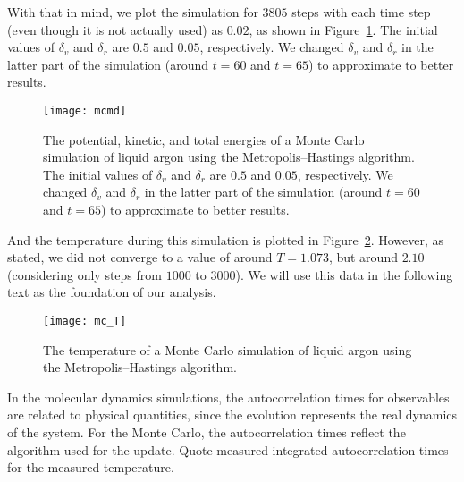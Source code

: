With that in mind, we plot the simulation for \(3805\) steps with each time step (even
though it is not actually used) as \(0.02\), as shown in Figure~\ref{fig:mcmd}.
The initial values of \(\delta_v\) and \(\delta_r\) are \(0.5\) and \(0.05\),
respectively. We changed \(\delta_v\) and \(\delta_r\) in the latter part of the
simulation (around \(t = 60\) and \(t = 65\)) to approximate to better results.
%
\begin{figure}
    \centering
    \texttt{[image: mcmd]}
    \caption{The potential, kinetic, and total energies of a Monte Carlo simulation of
        liquid argon using the Metropolis--Hastings algorithm.
        The initial values of \(\delta_v\) and \(\delta_r\) are \(0.5\) and \(0.05\),
        respectively. We changed \(\delta_v\) and \(\delta_r\) in the latter part of the
        simulation (around \(t = 60\) and \(t = 65\)) to approximate to better results.}
    \label{fig:mcmd}
\end{figure}
%
And the temperature during this simulation is plotted in Figure~\ref{fig:mc_T}.
However, as stated, we did not converge to a value of around \(T = 1.073\), but
around \(2.10\) (considering only steps from \(1000\) to \(3000\)).
We will use this data in the following text as the foundation of our analysis.

\begin{figure}
    \centering
    \texttt{[image: mc\_T]}
    \caption{The temperature of a Monte Carlo simulation of
        liquid argon using the Metropolis--Hastings algorithm.}
    \label{fig:mc_T}
\end{figure}

\Question{}
In the molecular dynamics simulations, the autocorrelation times for observables are related
to physical quantities, since the evolution represents the real dynamics of the system. For the
Monte Carlo, the autocorrelation times reflect the algorithm used for the update. Quote
measured integrated autocorrelation times for the measured temperature.

\Answer{}
